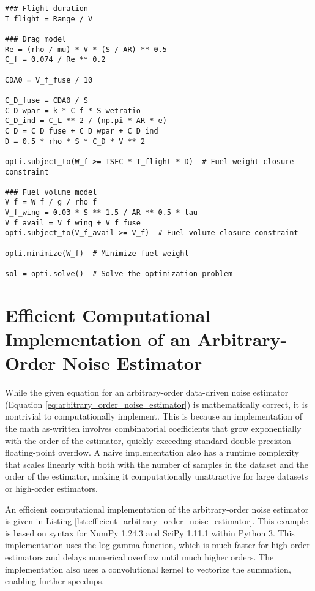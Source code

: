 \begin{verbatim}
### Flight duration
T_flight = Range / V

### Drag model
Re = (rho / mu) * V * (S / AR) ** 0.5
C_f = 0.074 / Re ** 0.2

CDA0 = V_f_fuse / 10

C_D_fuse = CDA0 / S
C_D_wpar = k * C_f * S_wetratio
C_D_ind = C_L ** 2 / (np.pi * AR * e)
C_D = C_D_fuse + C_D_wpar + C_D_ind
D = 0.5 * rho * S * C_D * V ** 2

opti.subject_to(W_f >= TSFC * T_flight * D)  # Fuel weight closure constraint

### Fuel volume model
V_f = W_f / g / rho_f
V_f_wing = 0.03 * S ** 1.5 / AR ** 0.5 * tau
V_f_avail = V_f_wing + V_f_fuse
opti.subject_to(V_f_avail >= V_f)  # Fuel volume closure constraint

opti.minimize(W_f)  # Minimize fuel weight

sol = opti.solve()  # Solve the optimization problem
    \end{verbatim}

\newpage
\section{Efficient Computational Implementation of an Arbitrary-Order Noise Estimator}
\label{sec:estimator_code_example}

While the given equation for an arbitrary-order data-driven noise estimator (Equation \ref{eq:arbitrary_order_noise_estimator}) is mathematically correct, it is nontrivial to computationally implement. This is because an implementation of the math as-written involves combinatorial coefficients that grow exponentially with the order of the estimator, quickly exceeding standard double-precision floating-point overflow. A naive implementation also has a runtime complexity that scales linearly with both with the number of samples in the dataset and the order of the estimator, making it computationally unattractive for large datasets or high-order estimators.

An efficient computational implementation of the arbitrary-order noise estimator is given in Listing \ref{lst:efficient_arbitrary_order_noise_estimator}. This example is based on syntax for NumPy 1.24.3 and SciPy 1.11.1 within Python 3. This implementation uses the log-gamma function, which is much faster for high-order estimators and delays numerical overflow until much higher orders. The implementation also uses a convolutional kernel to vectorize the summation, enabling further speedups.


